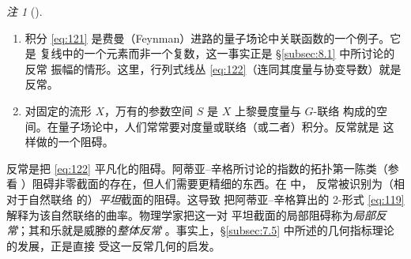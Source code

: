 \documentclass[11pt]{amsart}
\theoremstyle{definition}
\theoremstyle{remark}
\newtheorem{remark}[equation]{注}
\theoremstyle{plain}
\numberwithin{equation}{section}
\renewcommand{\:}{\colon}
\begin{document}
   \begin{remark}[]\label{thm:29}
 \ 

 \begin{enumerate}%


 \item 积分 \eqref{eq:121} 是费曼（Feynman）进路的量子场论中关联函数的一个例子。它是
 复线中的一个元素而非一个复数，这一事实正是 §\ref{subsec:8.1} 中所讨论的反常
 振幅的情形。这里，行列式线丛 \eqref{eq:122}（连同其度量与协变导数）就是反常。


 \item 对固定的流形 $X$，万有的参数空间 $S$ 是 $X$ 上黎曼度量与 $G$-联络
 构成的空间。在量子场论中，人们常常要对度量或联络（或二者）积分。反常就是
 这样做的一个阻碍。

 \end{enumerate}
   \end{remark}


反常是把 \eqref{eq:122} 平凡化的阻碍。阿蒂亚–辛格所讨论的指数的拓扑第一陈类（参看
\cite{S3}）阻碍非零截面的存在，但人们需要更精细的东西。在 \cite{F3} 中，
反常被识别为（相对于自然联络 \cite{BiF1} 的）\emph{平坦}截面的阻碍。这导致
把阿蒂亚–辛格算出的 2-形式 \eqref{eq:119} 解释为该自然联络的曲率。物理学家把这一对
平坦截面的局部阻碍称为\emph{局部反常}；其和乐就是威滕的\emph{整体反常}
\cite{Wi3}。事实上，§\ref{subsec:7.5} 中所述的几何指标理论的发展，正是直接
受这一反常几何的启发。

\end{document}
